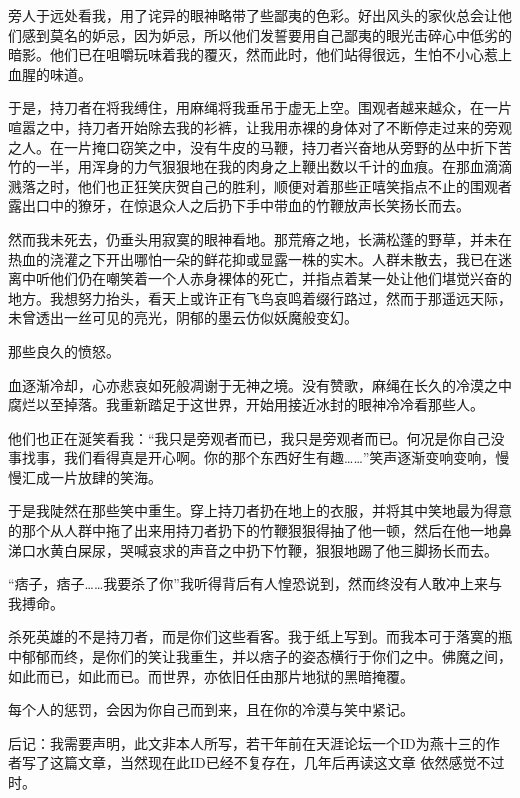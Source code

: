 旁人于远处看我，用了诧异的眼神略带了些鄙夷的色彩。好出风头的家伙总会让他们感到莫名的妒忌，因为妒忌，所以他们发誓要用自己鄙夷的眼光击碎心中低劣的暗影。他们已在咀嚼玩味着我的覆灭，然而此时，他们站得很远，生怕不小心惹上血腥的味道。

于是，持刀者在将我缚住，用麻绳将我垂吊于虚无上空。围观者越来越众，在一片喧嚣之中，持刀者开始除去我的衫裤，让我用赤裸的身体对了不断停走过来的旁观之人。在一片掩口窃笑之中，没有牛皮的马鞭，持刀者兴奋地从旁野的丛中折下苦竹的一半，用浑身的力气狠狠地在我的肉身之上鞭出数以千计的血痕。在那血滴滴溅落之时，他们也正狂笑庆贺自己的胜利，顺便对着那些正嘻笑指点不止的围观者露出口中的獠牙，在惊退众人之后扔下手中带血的竹鞭放声长笑扬长而去。

然而我未死去，仍垂头用寂寞的眼神看地。那荒瘠之地，长满松蓬的野草，并未在热血的浇灌之下开出哪怕一朵的鲜花抑或显露一株的实木。人群未散去，我已在迷离中听他们仍在嘲笑着一个人赤身裸体的死亡，并指点着某一处让他们堪觉兴奋的地方。我想努力抬头，看天上或许正有飞鸟哀鸣着缀行路过，然而于那遥远天际，未曾透出一丝可见的亮光，阴郁的墨云仿似妖魔般变幻。

那些良久的愤怒。

血逐渐冷却，心亦悲哀如死般凋谢于无神之境。没有赞歌，麻绳在长久的冷漠之中腐烂以至掉落。我重新踏足于这世界，开始用接近冰封的眼神冷冷看那些人。

他们也正在涎笑看我：“我只是旁观者而已，我只是旁观者而已。何况是你自己没事找事，我们看得真是开心啊。你的那个东西好生有趣……”笑声逐渐变响变响，慢慢汇成一片放肆的笑海。

于是我陡然在那些笑中重生。穿上持刀者扔在地上的衣服，并将其中笑地最为得意的那个从人群中拖了出来用持刀者扔下的竹鞭狠狠得抽了他一顿，然后在他一地鼻涕口水黄白屎尿，哭喊哀求的声音之中扔下竹鞭，狠狠地踢了他三脚扬长而去。

“痞子，痞子……我要杀了你”我听得背后有人惶恐说到，然而终没有人敢冲上来与我搏命。

杀死英雄的不是持刀者，而是你们这些看客。我于纸上写到。而我本可于落寞的瓶中郁郁而终，是你们的笑让我重生，并以痞子的姿态横行于你们之中。佛魔之间，如此而已，如此而已。而世界，亦依旧任由那片地狱的黑暗掩覆。

每个人的惩罚，会因为你自己而到来，且在你的冷漠与笑中紧记。

后记：我需要声明，此文非本人所写，若干年前在天涯论坛一个ID为燕十三的作者写了这篇文章，当然现在此ID已经不复存在，几年后再读这文章 依然感觉不过时。

\clearpage


